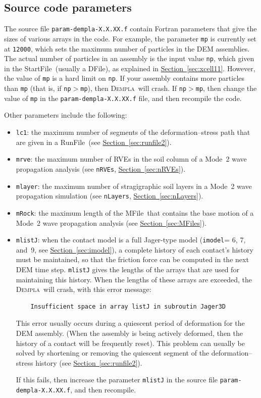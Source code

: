 \documentclass[letterpaper,11pt]{article}
\newcommand{\Dempla}{\textsc{Dempla}}
\newcommand{\RunFile}{\textsf{RunFile}}
\newcommand{\StartFile}{\textsf{StartFile}}
\newcommand{\DFile}{\textsf{DFile}}
\newcommand{\MFile}{\textsf{MFile}}
\begin{document}
\subsection{Source code parameters}
The source file \texttt{param-dempla-X.X.XX.f}
contain Fortran parameters that give the sizes
of various arrays in the code.
For example, the parameter \texttt{mp}
is currently set at \texttt{12000},
which sets the maximum number of particles in the
DEM assemblies.
The actual number of particles in an assembly
is the input value \texttt{np}, which given in
the \StartFile\ (usually a \DFile),
as explained in
\hyperref[sec:xcell11]{Section~\ref*{sec:xcell11}}.
However, the value of \texttt{mp} is a hard limit
on \texttt{np}.
If your assembly contains more particles than
\texttt{mp} (that is, if \texttt{np}$>$\texttt{mp}),
then \Dempla\ will crash.
If \texttt{np}$>$\texttt{mp}, then change the value
of \texttt{mp} in the \texttt{param-dempla-X.X.XX.f}
file, and then recompile the code.
\par
Other parameters include the following:
\begin{itemize}
\item
\texttt{lc1}:  the maximum number of segments of the
deformation--stress path that are given in a \RunFile\ (see
\hyperref[sec:runfile2]{Section~\ref*{sec:runfile2}}).
\item
\texttt{mrve}: the maximum number of RVEs in the soil
column of a Mode~2 wave propagation analysis
(see \texttt{nRVEs},
\hyperref[sec:nRVEs]{Section~\ref*{sec:nRVEs}}).
\item
\texttt{mlayer}: the maximum number of stragigraphic
soil layers in a Mode~2 wave propagation simulation
(see \texttt{nLayers},
\hyperref[sec:nLayers]{Section~\ref*{sec:nLayers}}).
\item
\texttt{mRock}: the maximum length of the \MFile\ 
that contains the base motion of a Mode~2 wave propagation
analysis
(see \hyperref[sec:MFiles]{Section~\ref*{sec:MFiles}}).
\item
\texttt{mlistJ}: when the contact model is a full
Jager-type model
(\texttt{imodel}= 6, 7, and~9,
see \hyperref[sec:imodel]{Section~\ref*{sec:imodel}}),
a complete history of each contact's history must
be maintained, so that the friction force can be
computed in the next DEM time step.
\texttt{mlistJ} gives the lengths of the arrays
that are used for maintaining this history.
When the lengths of these arrays are exceeded,
the \Dempla\ will crash, with this error message:
\begin{verbatim}
	Insufficient space in array listJ in subroutin Jager3D
\end{verbatim}
This error usually occurs during a quiescent period
of deformation for the DEM assembly.
(When the assembly is being actively deformed,
then the history of a contact will be frequently reset).
This problem can usually be solved by shortening or removing the
quiescent segment of the deformation--stress history
(see \hyperref[sec:runfile2]{Section~\ref*{sec:runfile2}}).
\par
If this fails, then increase the parameter \texttt{mlistJ}
in the source file \texttt{param-dempla-X.X.XX.f},
and then recompile.
\end{itemize}
\end{document}
